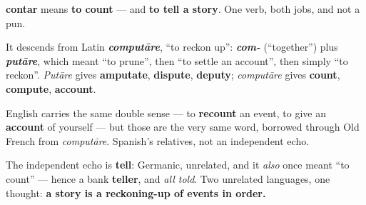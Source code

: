 \begin{cousinweb}
\textbf{contar} means \textbf{to count} — and \textbf{to tell a story}. One verb, both jobs, and not a pun.

It descends from Latin \emph{\textbf{computāre}}, \textquotedblleft{}to reckon up\textquotedblright{}: \emph{\textbf{com-}} (\textquotedblleft{}together\textquotedblright{}) plus \emph{\textbf{putāre}}, which meant \textquotedblleft{}to prune\textquotedblright{}, then \textquotedblleft{}to settle an account\textquotedblright{}, then simply \textquotedblleft{}to reckon\textquotedblright{}. \emph{Putāre} gives \textbf{amputate}, \textbf{dispute}, \textbf{deputy}; \emph{computāre} gives \textbf{count}, \textbf{compute}, \textbf{account}.

English carries the same double sense — to \textbf{recount} an event, to give an \textbf{account} of yourself — but those are the very same word, borrowed through Old French from \emph{computāre}. Spanish's relatives, not an independent echo.

The independent echo is \textbf{tell}: Germanic, unrelated, and it \emph{also} once meant \textquotedblleft{}to count\textquotedblright{} — hence a bank \textbf{teller}, and \emph{all told}. Two unrelated languages, one thought: \textbf{a story is a reckoning-up of events in order.}
\end{cousinweb}

